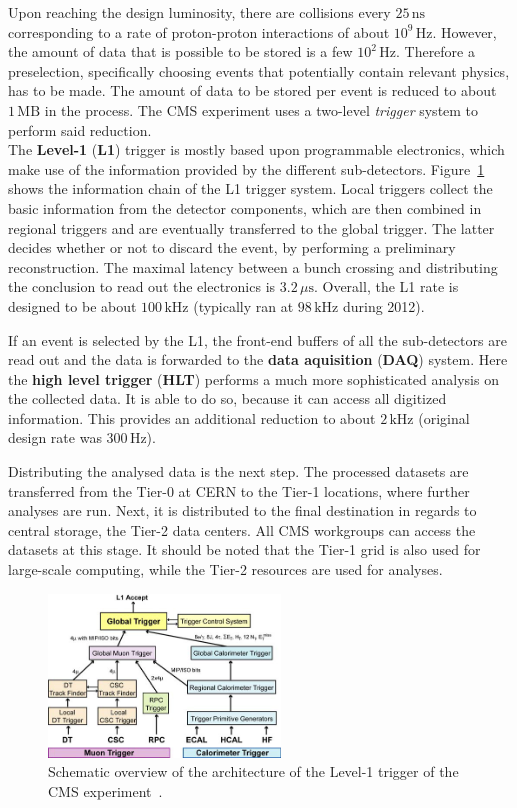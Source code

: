 Upon reaching the design luminosity, there are collisions every $25\,\text{ns}$ corresponding to a rate of proton-proton interactions of about $10^9\,\text{Hz}$. However, the amount of data that is possible to be stored is a few $10^2\,\text{Hz}$. Therefore a preselection, specifically choosing events that potentially contain relevant physics, has to be made. The amount of data to be stored per event is reduced to about $1\,\text{MB}$ in the process. The CMS experiment uses a two-level \textit{trigger} system to perform said reduction.\\

The \textbf{Level-1} (\textbf{L1}) trigger is mostly based upon programmable electronics, which make use of the information provided by the different sub-detectors. Figure~\ref{fig:lvl1trig} shows the information chain of the L1 trigger system. Local triggers collect the basic information from the detector components, which are then combined in regional triggers and are eventually transferred to the global trigger. The latter decides whether or not to discard the event, by performing a preliminary reconstruction. The maximal latency between a bunch crossing and distributing the conclusion to read out the electronics is $3.2\,\mu\text{s}$. Overall, the L1 rate is designed to be about $100\,\text{kHz}$ (typically ran at $98\,\text{kHz}$ during 2012).

If an event is selected by the L1, the front-end buffers of all the sub-detectors are read out and the data is forwarded to the \textbf{data aquisition} (\textbf{DAQ}) system. Here the \textbf{high level trigger} (\textbf{HLT}) performs a much more sophisticated analysis on the collected data. It is able to do so, because it can access all digitized information. This provides an additional reduction to about $2\,\text{kHz}$ (original design rate was $300\,\text{Hz}$).

Distributing the analysed data is the next step. The processed datasets are transferred from the Tier-0 at CERN to the Tier-1 locations, where further analyses are run. Next, it is distributed to the final destination in regards to central storage, the Tier-2 data centers. All CMS workgroups can access the datasets at this stage. It should be noted that the Tier-1 grid is also used for large-scale computing, while the Tier-2 resources are used for analyses.


\begin{figure}[ht!]
  \centering
  \includegraphics[width=0.55\textwidth]{plots/lvl1trigger.jpg}
  \caption{Schematic overview of the architecture of the Level-1 trigger of the CMS experiment~\cite{cmsjinst}.}
  \label{fig:lvl1trig}
\end{figure}


